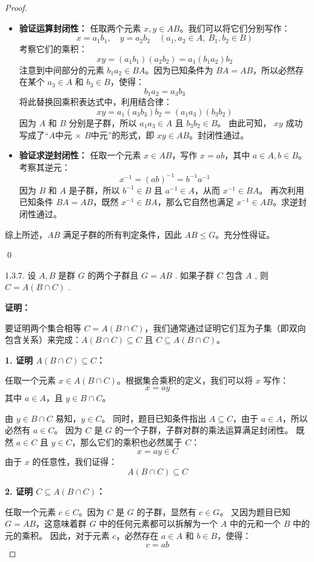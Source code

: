 \documentclass[]{article}
\begin{document}
\begin{proof}
\begin{itemize}
	\item \textbf{验证运算封闭性：}
	任取两个元素 $x, y \in AB$。我们可以将它们分别写作：
	\[ x = a_1 b_1, \quad y = a_2 b_2 \quad (a_1, a_2 \in A, \ B_1, b_2 \in B) \]
	考察它们的乘积：
	\[ xy = (a_1 b_1)(a_2 b_2) = a_1 (b_1 a_2) b_2 \]
	注意到中间部分的元素 $b_1 a_2 \in BA$。因为已知条件为 $BA = AB$，所以必然存在某个 $a_3 \in A$ 和 $b_3 \in B$，使得：
	\[ b_1 a_2 = a_3 b_3 \]
	将此替换回乘积表达式中，利用结合律：
	\[ xy = a_1 (a_3 b_3) b_2 = (a_1 a_3)(b_3 b_2) \]
	因为 $A$ 和 $B$ 分别是子群，所以 $a_1 a_3 \in A$ 且 $b_3 b_2 \in B$。
	由此可知， $xy$ 成功写成了“$A$中元 $\times$ $B$中元”的形式，即 $xy \in AB$。封闭性通过。
	
	\item \textbf{验证求逆封闭性：}
	任取一个元素 $x \in AB$，写作 $x = ab$，其中 $a \in A, b \in B$。
	考察其逆元：
	\[ x^{-1} = (ab)^{-1} = b^{-1} a^{-1} \]
	因为 $B$ 和 $A$ 是子群，所以 $b^{-1} \in B$ 且 $a^{-1} \in A$，从而 $x^{-1} \in BA$。
	再次利用已知条件 $BA = AB$，既然 $x^{-1} \in BA$，那么它自然也满足 $x^{-1} \in AB$。求逆封闭性通过。
\end{itemize}

综上所述，$AB$ 满足子群的所有判定条件，因此 $AB \leqslant G$。充分性得证。

\qed

1.3.7. 设 $A, B$ 是群 $G$ 的两个子群且 $G = AB$ . 如果子群 $C$ 包含 $A$ , 则 $C = A(B \cap C)$ . 

\bigskip
\noindent \textbf{证明：} 

要证明两个集合相等 $C = A(B \cap C)$，我们通常通过证明它们互为子集（即双向包含关系）来完成：$A(B \cap C) \subseteq C$ 且 $C \subseteq A(B \cap C)$。

\bigskip
\noindent \textbf{1. 证明 $A(B \cap C) \subseteq C$：}

任取一个元素 $x \in A(B \cap C)$。根据集合乘积的定义，我们可以将 $x$ 写作：
\[ x = ay \]
其中 $a \in A$，且 $y \in B \cap C$。

由 $y \in B \cap C$ 易知，$y \in C$。
同时，题目已知条件指出 $A \subseteq C$，由于 $a \in A$，所以必然有 $a \in C$。
因为 $C$ 是 $G$ 的一个子群，子群对群的乘法运算满足封闭性。
既然 $a \in C$ 且 $y \in C$，那么它们的乘积也必然属于 $C$：
\[ x = ay \in C \]
由于 $x$ 的任意性，我们证得：
\[ A(B \cap C) \subseteq C \]

\bigskip
\noindent \textbf{2. 证明 $C \subseteq A(B \cap C)$：}

任取一个元素 $c \in C$。因为 $C$ 是 $G$ 的子群，显然有 $c \in G$。
又因为题目已知 $G = AB$，这意味着群 $G$ 中的任何元素都可以拆解为一个 $A$ 中的元和一个 $B$ 中的元的乘积。
因此，对于元素 $c$，必然存在 $a \in A$ 和 $b \in B$，使得：
\[ c = ab \]


\end{proof}
\end{document}
